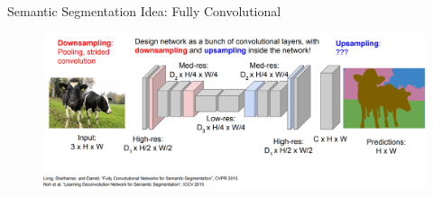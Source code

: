 \begin{frame}[allowframebreaks]{Semantic Segmentation Idea: Fully Convolutional}
\framebreak

\begin{figure}
\centering
\includegraphics[width=1.0\textwidth,height=1.0\textheight,keepaspectratio]{images/segmentation/sem_10.png}
\end{figure}
    
\end{frame}

